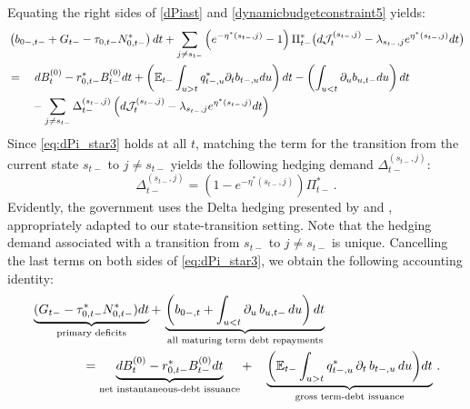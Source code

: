\documentclass[12pt]{article}
\begin{document}
Equating the right sides of \eqref{dPiast} and \eqref{dynamicbudgetconstraint5} yields: 
\begin{align}\label{eq:dPi_star3}
& \left(b_{0-, t-} + G_{t-} - \tau_{0, t-} N_{0, t-} ^\ast  \right)dt   
 + \sum_{j\neq s_{t-}} \left(e^{-\eta^\ast (s_{t-}, j)} - 1 \right)\Pi_{t-} ^\ast 
	\big(d {\mathcal J}_t^{(s_{t-}, j)} 
	- \lambda_{s_{t-}, j} e^{\eta^\ast (s_{t-}, j)} dt \big)  \notag \\
&	= \quad 
d B^{(0)}_t  -r_{0, t-}^\ast B^{(0)}_{t-} dt   +   \left( \mathbb{E}_{t-}\int_{u> t} q^\ast_{t-, u}\partial_tb_{t-, u} du \right) dt - \left(\int_{u<t} \partial_u b_{u, t-} du\right)dt  \notag \\
&  \quad\quad  
- \sum_{j\neq s_{t-}}\Delta_{t-}^{(s_{t-}, j)} \left(d {\mathcal J}_t^{(s_{t-}, j)}-\lambda_{s_{t-}, j}e^{\eta^*(s_{t-}, j)}d t \right)
	\end{align}
Since \eqref{eq:dPi_star3}  holds at all $t$, matching the term for the   transition from the current state $s_{t-}$ to $j\neq s_{t-}$ yields the following hedging demand $\Delta_{t-}^{(s_{t-}, j)}$: 
\begin{equation} \label{Delta} 
	\Delta_{t-}^{(s_{t-}, j)} =   \left( 1 - e^{-\eta^*(s_{t-}, j)} \right) \Pi_{t-}^\ast\, . 
\end{equation} 
Evidently, the government uses the   Delta hedging presented by \cite{BlackScholes1973} and \cite{merton1973theory}, appropriately adapted to our state-transition setting. 
Note that the  hedging demand associated with a  transition from $s_{t-}$ to $j\neq s_{t-}$ is unique. %
Cancelling the last terms on both sides of \eqref{eq:dPi_star3}, we obtain the following accounting identity:  
\begin{align}\label{eq:dPi_star22}
& \underbrace{(G_{t-} - \tau^\ast_{0,t-} N^\ast_{0,t-} ) d t}_{\text{primary deficits}} + \, %
\underbrace{\biggl( b_{0-,t} + \int_{u<t}\partial_u\, b_{u,t-}\, du\biggr)  \, dt}_{\text{all maturing term debt repayments}}
\notag \\
 &\quad \quad  \quad \quad =   \underbrace{dB^{(0)}_t  -r_{0, t-}^* B^{(0)}_{t-}dt}_{\text{net instantaneous-debt issuance}}
 + \quad
 \underbrace{\biggl(\mathbb E_{t-}\int_{u > t} q_{t-,u}^*\, \partial_t\, b_{t-,u}\, du\biggr) dt}_{\text{gross term-debt issuance}} 
\, . 
\end{align}
\end{document}
